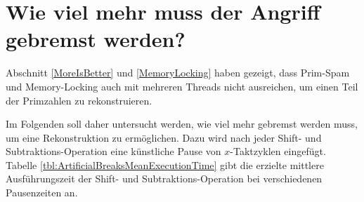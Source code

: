 



















\section{Wie viel mehr muss der Angriff gebremst werden?}
\label{Howfast}

Abschnitt \ref{MoreIsBetter} und \ref{MemoryLocking} haben gezeigt, dass Prim-Spam und Memory-Locking auch mit mehreren Threads nicht ausreichen, um einen Teil der Primzahlen zu rekonstruieren.

Im Folgenden soll daher untersucht werden, wie viel mehr gebremst werden muss, um eine Rekonstruktion zu ermöglichen.
Dazu wird nach jeder Shift- und Subtraktions-Operation eine künstliche Pause von $x$-Taktzyklen eingefügt.
Tabelle \ref{tbl:ArtificialBreaksMeanExecutionTime} gibt die erzielte mittlere Ausführungszeit der Shift- und Subtraktions-Operation bei verschiedenen Pausenzeiten an.

